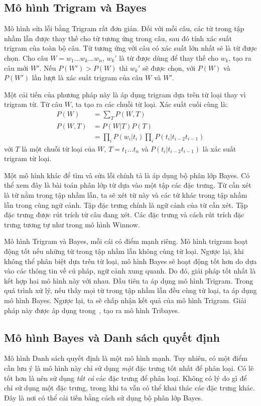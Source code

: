 \documentclass[a4paper,oneside,14pt]{extbook} %
\begin{document}
\subsection{Mô hình Trigram và Bayes}

Mô hình sửa lỗi bằng Trigram rất đơn giản. Đối với mỗi câu, các từ
trong tập nhầm lẫn được thay thế cho từ tương ứng trong câu, sau đó
tính xác suất trigram của toàn bộ câu. Từ tương ứng với câu có xác
suất lớn nhất sẽ là từ được chọn. Cho câu $W =
w_1\ldots{} w_k\ldots{} w_n$, $w_k'$ là từ được dùng để thay thế cho
$w_k$, tạo ra câu mới $W'$. Nếu $P(W') > P(W)$ thì $w_k'$ sẽ được
chọn, với $P(W)$ và $P(W')$ lần lượt là xác suất trigram của câu $W$
và $W'$.

Một cải tiến của phương pháp này là
áp dụng trigram dựa trên từ loại thay vì trigram từ. Từ câu $W$, ta
tạo ra các chuỗi từ loại. Xác suất cuối cùng là:
\begin{align}
P(W)  &=\sum_T P(W,T)\\
P(W,T)&=P(W|T)P(T)\\
      &=\prod_i P(w_i|t_i)\prod_i P(t_i|t_{i-2}t_{i-1})
\end{align}
với $T$ là một chuỗi từ loại của $W$, $T=t_1\ldots{} t_n$ và
$P(t_i|t_{i-2}t_{i-1})$ là xác suất trigram từ loại.

Một mô hình khác để tìm và sửa lỗi chính tả là áp dụng bộ phân lớp
Bayes. Có thể xem đây là bài toán phân lớp từ dựa vào một tập các đặc
trưng. Từ cần xét là từ nằm trong tập nhầm lẫn, ta sẽ xét từ này và
các từ khác trong tập nhầm lẫn trong cùng ngữ cảnh. Tập đặc trưng
chính là ngữ cảnh của từ cần xét. Tập đặc trưng được rút trích từ câu
đang xét. Các đặc trưng và cách rút trích đặc trưng tương tự như trong
mô hình Winnow.

Mô hình Trigram và Bayes, mỗi cái có điểm mạnh riêng. Mô hình trigram
hoạt động tốt nếu những từ trong tập nhầm lẫn không cùng từ
loại. Ngược lại, khi không thể phân biệt dựa trên từ loại, mô hình
Bayes sẽ hoạt động tốt hơn do dựa vào các thông tin về cú pháp, ngữ
cảnh xung quanh. Do đó, giải pháp tốt nhất là kết hợp hai mô hình này
với nhau. Đầu tiên ta áp dụng mô hình Trigram. Trong quá trình xử lý,
nếu thấy mọi từ trong tập nhầm lẫn đều cùng từ loại, ta áp dụng mô
hình Bayes. Ngược lại, ta sẽ chấp nhận kết quả của mô hình
Trigram. Giải pháp này được áp dụng trong~\cite{Golding96}, tạo ra mô
hình Tribayes.


\subsection{Mô hình Bayes và Danh sách quyết định}
Mô hình Danh sách quyết định là một mô hình mạnh. Tuy nhiên, có một
điểm cần lưu ý là mô hình này chỉ sử dụng {\em một} đặc trưng tốt nhất
để phân loại. Có lẽ tốt hơn là nên sử dụng {\em tất cả} các đặc trưng
để phân loại. Không có lý do gì để chỉ sử dụng một đặc trưng, trong
khi ta vẫn có thể khai thác các đặc trưng khác. Đây là nơi có thể cải
tiến bằng cách sử dụng bộ phân lớp Bayes.
\end{document}
